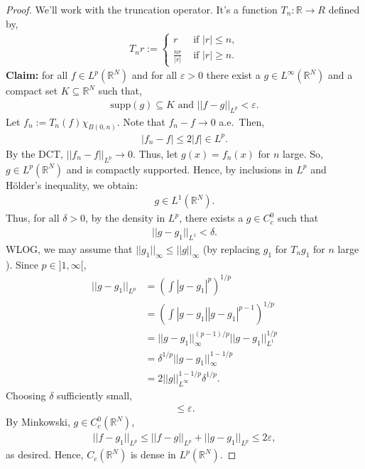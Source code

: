 \documentclass[psamsfonts]{amsart}
\theoremstyle{definition}
\theoremstyle{remark}
\newcommand{\R}[0]{\mathbb{R}}
\newcommand{\eps}[0]{\varepsilon}
\numberwithin{equation}{section}
\begin{document}
\begin{proof} 
	We'll work with the truncation operator. It's a function \( T_n: \R \rightarrow R \) defined by, 
	\begin{align*}
			T_nr := \begin{cases}
				r & \text{ if } |r| \leq n, \\
				\frac{nr}{|r|} & \text{ if } |r| \geq n.
			\end{cases}
	\end{align*}	
	\textbf{Claim:} for all \( f \in L^p(\R^N) \) and for all \( \eps > 0 \) there exist a \( g \in L^\infty (\R^N) \) and a compact set \( K \subseteq \R^N \) such that, 
	\begin{align*}
		\text{supp}(g)  \subseteq  K \text{ and } || f - g ||_{L^p} < \eps. 
	\end{align*}
	Let \( f_n := T_n(f)\chi_{B(0,n)} \). Note that  \( f_n - f \rightarrow 0 \) a.e.\ Then, 
	\begin{align*}
		| f_n - f| \leq 2 |f| \in L^p. 
	\end{align*}
	By the DCT,  \( ||f_n - f||_{L^p} \rightarrow 0 \). Thus, let \( g(x) = f_n(x) \) for \( n \) large. So, \( g \in L^p(\R^N) \) and is compactly supported. Hence, by inclusions in \(L^p \) and Hölder's inequality, we obtain:
	\begin{align*}
		g \in L^1(\R^N). 
	\end{align*}
	Thus, for all \( \delta > 0 \), by the density in \(L^p \), there exists a \( g \in C_c^0 \) such that  
	\begin{align*}
		|| g - g_1||_{L^1} < \delta.
	\end{align*}
	WLOG, we may assume that \( ||g_1||_\infty \leq || g ||_\infty \) (by replacing \( g_1 \) for \( T_n g_1 \) for \( n \) large ). Since \( p \in ]1, \infty [ \), 
	\begin{align*}
		|| g - g_1 ||_{L^p} & = \left( \int |g-g_1|^p \right)^{1/p}  \\
		& = \left(  \int |g-g_1||g-g_1|^{p-1} \right)^{1/p} \\
		& = || g-g_1||_\infty^{(p-1)/p} ||g-g_1||_{L^1}^{1/p} \\
		& = \delta^{1/p} ||g-g_1||_\infty^{1-1/p}  \\
		& = 2 ||g||_{L^\infty}^{1-1/p} \delta^{1/p}.
	\end{align*}
	Choosing \( \delta \) sufficiently small,
	\begin{align*}
		\leq \eps.
	\end{align*}
	By Minkowski, \( g \in C_c^0(\R^N) \), 
	\begin{align*}
		||f-g_1||_{L^p} \leq || f -g ||_{L^p} + ||g-g_1||_{L^p} \leq 2 \eps, 
	\end{align*}
	as desired. Hence, \( C_c(\R^N) \) is dense in \(L^p(\R^N) \). 
\end{proof} 
\end{document}
